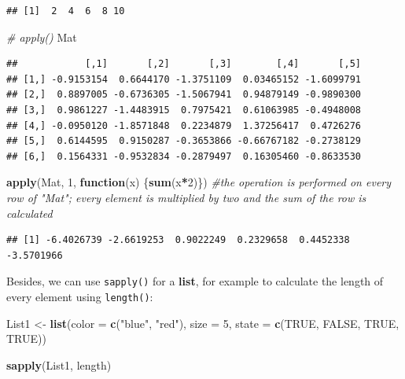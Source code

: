 \documentclass[
]{book}
\newenvironment{Shaded}{\begin{snugshade}}{\end{snugshade}}
\newcommand{\AttributeTok}[1]{\textcolor[rgb]{0.13,0.29,0.53}{#1}}
\newcommand{\CommentTok}[1]{\textcolor[rgb]{0.56,0.35,0.01}{\textit{#1}}}
\newcommand{\ConstantTok}[1]{\textcolor[rgb]{0.56,0.35,0.01}{#1}}
\newcommand{\ControlFlowTok}[1]{\textcolor[rgb]{0.13,0.29,0.53}{\textbf{#1}}}
\newcommand{\DecValTok}[1]{\textcolor[rgb]{0.00,0.00,0.81}{#1}}
\newcommand{\FunctionTok}[1]{\textcolor[rgb]{0.13,0.29,0.53}{\textbf{#1}}}
\newcommand{\NormalTok}[1]{#1}
\newcommand{\OtherTok}[1]{\textcolor[rgb]{0.56,0.35,0.01}{#1}}
\newcommand{\SpecialCharTok}[1]{\textcolor[rgb]{0.81,0.36,0.00}{\textbf{#1}}}
\newcommand{\StringTok}[1]{\textcolor[rgb]{0.31,0.60,0.02}{#1}}
\begin{document}
\begin{verbatim}
## [1]  2  4  6  8 10
\end{verbatim}

\begin{Shaded}
\begin{Highlighting}[]
\CommentTok{\# apply()}
\NormalTok{Mat }
\end{Highlighting}
\end{Shaded}

\begin{verbatim}
##            [,1]       [,2]       [,3]        [,4]       [,5]
## [1,] -0.9153154  0.6644170 -1.3751109  0.03465152 -1.6099791
## [2,]  0.8897005 -0.6736305 -1.5067941  0.94879149 -0.9890300
## [3,]  0.9861227 -1.4483915  0.7975421  0.61063985 -0.4948008
## [4,] -0.0950120 -1.8571848  0.2234879  1.37256417  0.4726276
## [5,]  0.6144595  0.9150287 -0.3653866 -0.66767182 -0.2738129
## [6,]  0.1564331 -0.9532834 -0.2879497  0.16305460 -0.8633530
\end{verbatim}

\begin{Shaded}
\begin{Highlighting}[]
\FunctionTok{apply}\NormalTok{(Mat, }\DecValTok{1}\NormalTok{, }\ControlFlowTok{function}\NormalTok{(x) \{}\FunctionTok{sum}\NormalTok{(x}\SpecialCharTok{*}\DecValTok{2}\NormalTok{)\}) }\CommentTok{\#the operation is performed on every row of "Mat"; every element is multiplied by two and the sum of the row is calculated}
\end{Highlighting}
\end{Shaded}

\begin{verbatim}
## [1] -6.4026739 -2.6619253  0.9022249  0.2329658  0.4452338 -3.5701966
\end{verbatim}

Besides, we can use \texttt{sapply()} for a \textbf{list}, for example to calculate the length of every element using \texttt{length()}:

\begin{Shaded}
\begin{Highlighting}[]
\NormalTok{List1 }\OtherTok{\textless{}{-}} \FunctionTok{list}\NormalTok{(}\AttributeTok{color =} \FunctionTok{c}\NormalTok{(}\StringTok{"blue"}\NormalTok{, }\StringTok{"red"}\NormalTok{), }\AttributeTok{size =} \DecValTok{5}\NormalTok{, }\AttributeTok{state =} \FunctionTok{c}\NormalTok{(}\ConstantTok{TRUE}\NormalTok{, }\ConstantTok{FALSE}\NormalTok{, }\ConstantTok{TRUE}\NormalTok{, }\ConstantTok{TRUE}\NormalTok{))}

\FunctionTok{sapply}\NormalTok{(List1, length)}
\end{Highlighting}
\end{Shaded}
\end{document}
